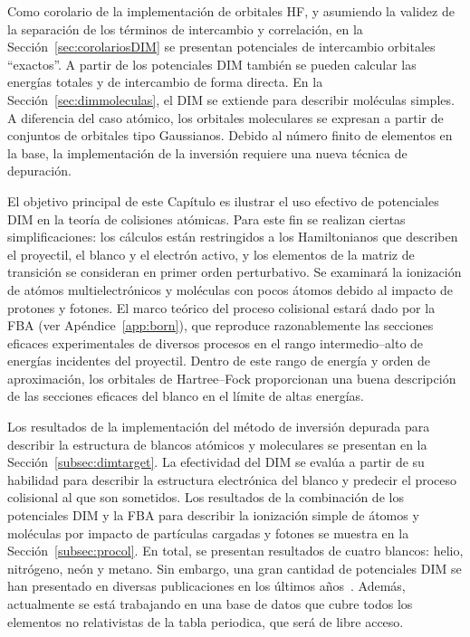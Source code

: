 Como corolario de la implementación de orbitales HF, y asumiendo la 
validez de la separación de los términos de intercambio y correlación, 
en la Sección~\ref{sec:corolariosDIM} se presentan potenciales de 
intercambio orbitales ``exactos''. A partir de los potenciales DIM 
también se pueden calcular las energías totales y de intercambio de 
forma directa. En la Sección~\ref{sec:dimmoleculas}, el DIM se extiende 
para describir moléculas simples. A diferencia del caso atómico, los 
orbitales moleculares se expresan a partir de conjuntos de orbitales 
tipo Gaussianos. Debido al número finito de elementos en la base, la 
implementación de la inversión requiere una nueva técnica de depuración. 

El objetivo principal de este Capítulo es ilustrar el uso efectivo de 
potenciales DIM en la teoría de colisiones atómicas. Para este fin 
se realizan ciertas simplificaciones: los cálculos están restringidos a 
los Hamiltonianos que describen el proyectil, el blanco y el electrón 
activo, y los elementos de la matriz de transición se consideran en 
primer orden perturbativo. Se examinará la ionización de atómos 
multielectrónicos y moléculas con pocos átomos debido al impacto de 
protones y fotones. El marco teórico del proceso colisional estará dado 
por la FBA (ver Apéndice~\ref{app:born}), que reproduce razonablemente 
las secciones eficaces experimentales de diversos procesos en el rango 
intermedio--alto de energías incidentes del proyectil. Dentro de este 
rango de energía y orden de aproximación, los orbitales de Hartree--Fock 
proporcionan una buena descripción de las secciones eficaces del blanco 
en el límite de altas energías.

Los resultados de la implementación del método de inversión depurada 
para describir la estructura de blancos atómicos y moleculares se 
presentan en la Sección~\ref{subsec:dimtarget}. La efectividad del DIM 
se evalúa a partir de su habilidad para describir la estructura 
electrónica del blanco y predecir el proceso colisional al que son 
sometidos. Los resultados de la combinación de los potenciales DIM y la 
FBA para describir la ionización simple de átomos y moléculas por 
impacto de partículas cargadas y fotones se muestra en la 
Sección~\ref{subsec:procol}. En total, se presentan 
resultados de cuatro blancos: helio, nitrógeno, neón y metano. Sin 
embargo, una gran cantidad de potenciales DIM se han presentado en 
diversas publicaciones en los últimos años~\cite{Mendez:16,Mendez:19dim,
Mendez:18}. Además, actualmente se está trabajando en una base de datos 
que cubre todos los elementos no relativistas de la tabla periodica, que 
será de libre acceso.

